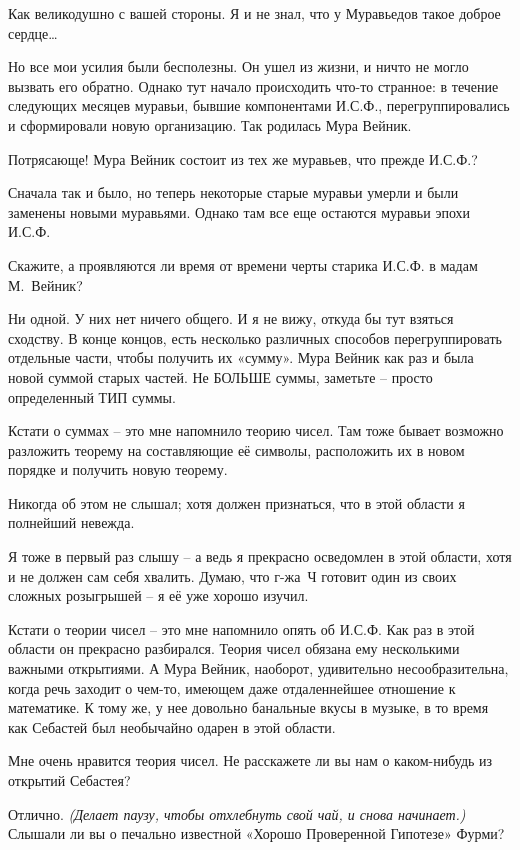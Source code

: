 \documentclass[../main.tex]{subfiles}
\begin{document}
\begin{dialogue}
 Как великодушно с вашей стороны. Я и не знал, что у Муравьедов такое доброе сердце\ldots{}

 Но все мои усилия были бесполезны. Он ушел из жизни, и ничто не могло вызвать его обратно. Однако тут начало происходить что-то странное: в течение следующих месяцев муравьи, бывшие компонентами И.С.Ф., перегруппировались и сформировали новую организацию. Так родилась Мура Вейник.

 Потрясающе! Мура Вейник состоит из тех же муравьев, что прежде И.С.Ф.?

 Сначала так и было, но теперь некоторые старые муравьи умерли и были заменены новыми муравьями. Однако там все еще остаются муравьи эпохи И.С.Ф.

 Скажите, а проявляются ли время от времени черты старика И.С.Ф. в мадам М.~Вейник?

 Ни одной. У них нет ничего общего. И я не вижу, откуда бы тут взяться сходству. В конце концов, есть несколько различных способов перегруппировать отдельные части, чтобы получить их «сумму». Мура Вейник как раз и была новой суммой старых частей. Не БОЛЬШЕ суммы, заметьте \--- просто определенный ТИП суммы.

 Кстати о суммах \--- это мне напомнило теорию чисел. Там тоже бывает возможно разложить теорему на составляющие её символы, расположить их в новом порядке и получить новую теорему.

 Никогда об этом не слышал; хотя должен признаться, что в этой области я полнейший невежда.

 Я тоже в первый раз слышу \--- а ведь я прекрасно осведомлен в этой области, хотя и не должен сам себя хвалить. Думаю, что г-жа~Ч готовит один из своих сложных розыгрышей \--- я её уже хорошо изучил.

 Кстати о теории чисел \--- это мне напомнило опять об И.С.Ф\@. Как раз в этой области он прекрасно разбирался. Теория чисел обязана ему несколькими важными открытиями. А Мура Вейник, наоборот, удивительно несообразительна, когда речь заходит о чем-то, имеющем даже отдаленнейшее отношение к математике. К тому же, у нее довольно банальные вкусы в музыке, в то время как Себастей был необычайно одарен в этой области.

 Мне очень нравится теория чисел. Не расскажете ли вы нам о каком-нибудь из открытий Себастея?

 Отлично. \emph{(Делает паузу, чтобы отхлебнуть свой чай, и снова начинает.)} Слышали ли вы о печально известной «Хорошо Проверенной Гипотезе» Фурми?


\end{dialogue}
\end{document}
